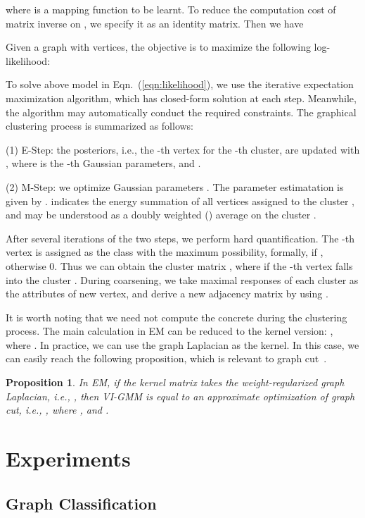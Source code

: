 \documentclass[letterpaper]{article} \usepackage{aaai19}  \usepackage{times}  \usepackage{helvet}  \usepackage{courier}  \usepackage{url}  \usepackage{graphicx}  \frenchspacing  \setlength{\pdfpagewidth}{8.5in}  \setlength{\pdfpageheight}{11in}
\def\ie{{i.e.}} \def\etal{{et.al}}
\newtheorem{prop}{Proposition}
\begin{document}
where  is a mapping function to be learnt. To reduce the computation cost of matrix inverse on , we specify it as an identity matrix. Then we have

Given a graph with  vertices, the objective is to maximize the following log-likelihood:


To solve above model in Eqn.~(\ref{eqn:likelihood}), we use the iterative expectation maximization algorithm, which has closed-form solution at each step. Meanwhile, the algorithm may automatically conduct the required constraints. The graphical clustering process is summarized as follows:

(1) {E-Step}: the posteriors, \ie, the -th vertex for the -th cluster, are updated with
,
where  is the -th Gaussian parameters, and .

(2) {M-Step}: we optimize Gaussian parameters . The parameter estimatation is given by .
 indicates the energy summation of all vertices assigned to the cluster , and  may be understood as a doubly weighted () average on the cluster .

After several iterations of the two steps, we perform hard quantification. The -th vertex is assigned as the class with the maximum possibility, formally,  if , otherwise 0. Thus we can obtain the cluster matrix , where  if the -th vertex falls into the cluster . During coarsening, we take maximal responses of each cluster as the attributes of new vertex, and derive a new adjacency matrix by using .

It is worth noting that we need not compute the concrete  during the clustering process. The main calculation  in EM can be reduced to the kernel version:
,
where .
In practice, we can use the graph Laplacian  as the kernel. In this case, we can easily reach the following proposition, which is relevant to graph cut~\cite{dhillon2007weighted}.
\begin{prop}
	In EM, if the kernel matrix takes the weight-regularized graph Laplacian, \ie, , then VI-GMM is equal to an approximate optimization of graph cut, \ie, ,
	where , and .
\end{prop}


\section{Experiments}

\subsection{Graph Classification}
\end{document}
